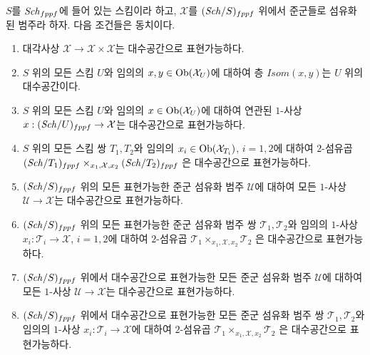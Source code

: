 \begin{lemma}
\label{lemma-representable-diagonal}
$S$를 $\mathit{Sch}_{fppf}$에 들어 있는 스킴이라 하고, $\mathcal{X}$를
$(\mathit{Sch}/S)_{fppf}$ 위에서 준군들로 섬유화된 범주라 하자. 다음 조건들은
동치이다.
\begin{enumerate}
\item 대각사상 $\mathcal{X} \to \mathcal{X} \times \mathcal{X}$는
대수공간으로 표현가능하다.
\item $S$ 위의 모든 스킴 $U$와 임의의
$x, y \in \mathop{\mathrm{Ob}}\nolimits(\mathcal{X}_U)$에 대하여 층 $\mathit{Isom}(x, y)$는
$U$ 위의 대수공간이다.
\item $S$ 위의 모든 스킴 $U$와 임의의 $x \in \mathop{\mathrm{Ob}}\nolimits(\mathcal{X}_U)$에
대하여 연관된 $1$-사상 $x : (\mathit{Sch}/U)_{fppf} \to \mathcal{X}$는
대수공간으로 표현가능하다.
\item $S$ 위의 모든 스킴 쌍 $T_1, T_2$와 임의의
$x_i \in \mathop{\mathrm{Ob}}\nolimits(\mathcal{X}_{T_i})$, $i = 1, 2$에 대하여 $2$-섬유곱
$(\mathit{Sch}/T_1)_{fppf} \times_{x_1, \mathcal{X}, x_2}
(\mathit{Sch}/T_2)_{fppf}$
은 대수공간으로 표현가능하다.
\item $(\mathit{Sch}/S)_{fppf}$ 위의 모든 표현가능한 준군 섬유화 범주
$\mathcal{U}$에 대하여 모든 $1$-사상 $\mathcal{U} \to \mathcal{X}$는
대수공간으로 표현가능하다.
\item $(\mathit{Sch}/S)_{fppf}$ 위의 모든 표현가능한 준군 섬유화 범주 쌍
$\mathcal{T}_1, \mathcal{T}_2$와 임의의 $1$-사상
$x_i : \mathcal{T}_i \to \mathcal{X}$, $i = 1, 2$에 대하여
$2$-섬유곱 $\mathcal{T}_1 \times_{x_1, \mathcal{X}, x_2} \mathcal{T}_2$
은 대수공간으로 표현가능하다.
\item $(\mathit{Sch}/S)_{fppf}$ 위에서 대수공간으로 표현가능한 모든 준군 섬유화
범주 $\mathcal{U}$에 대하여 모든 $1$-사상
$\mathcal{U} \to \mathcal{X}$는 대수공간으로 표현가능하다.
\item $(\mathit{Sch}/S)_{fppf}$ 위에서 대수공간으로 표현가능한 모든 준군 섬유화
범주 쌍 $\mathcal{T}_1, \mathcal{T}_2$와 임의의 $1$-사상
$x_i : \mathcal{T}_i \to \mathcal{X}$에 대하여
$2$-섬유곱 $\mathcal{T}_1 \times_{x_1, \mathcal{X}, x_2} \mathcal{T}_2$
은 대수공간으로 표현가능하다.
\end{enumerate}
\end{lemma}

